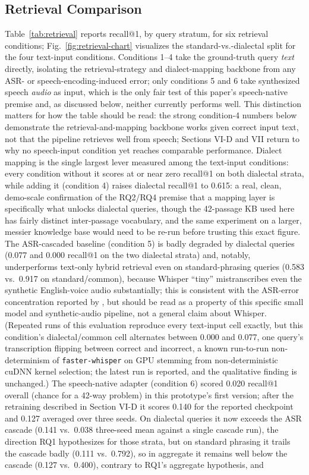 \documentclass[conference]{IEEEtran}
\begin{document}
\subsection{Retrieval Comparison}
Table~\ref{tab:retrieval} reports recall@1, by query stratum, for six retrieval conditions; Fig.~\ref{fig:retrieval-chart} visualizes the standard-vs.-dialectal split for the four text-input conditions. Conditions 1--4 take the ground-truth query \emph{text} directly, isolating the retrieval-strategy and dialect-mapping backbone from any ASR- or speech-encoding-induced error; only conditions 5 and 6 take synthesized speech \emph{audio} as input, which is the only fair test of this paper's speech-native premise and, as discussed below, neither currently performs well. This distinction matters for how the table should be read: the strong condition-4 numbers below demonstrate the retrieval-and-mapping backbone works given correct input text, not that the pipeline retrieves well from speech; Sections VI-D and VII return to why no speech-input condition yet reaches comparable performance. Dialect mapping is the single largest lever measured among the text-input conditions: every condition without it scores at or near zero recall@1 on both dialectal strata, while adding it (condition 4) raises dialectal recall@1 to 0.615: a real, clean, demo-scale confirmation of the RQ2/RQ4 premise that a mapping layer is specifically what unlocks dialectal queries, though the 42-passage KB used here has fairly distinct inter-passage vocabulary, and the same experiment on a larger, messier knowledge base would need to be re-run before trusting this exact figure. The ASR-cascaded baseline (condition 5) is badly degraded by dialectal queries (0.077 and 0.000 recall@1 on the two dialectal strata) and, notably, underperforms text-only hybrid retrieval even on standard-phrasing queries (0.583 vs.\ 0.917 on standard/common), because Whisper ``tiny'' mistranscribes even the synthetic English-voice audio substantially; this is consistent with the ASR-error concentration reported by \cite{benchmarkingasr2026,dialectmatters2026}, but should be read as a property of this specific small model and synthetic-audio pipeline, not a general claim about Whisper. (Repeated runs of this evaluation reproduce every text-input cell exactly, but this condition's dialectal/common cell alternates between 0.000 and 0.077, one query's transcription flipping between correct and incorrect, a known run-to-run non-determinism of \texttt{faster-whisper} on GPU stemming from non-deterministic cuDNN kernel selection; the latest run is reported, and the qualitative finding is unchanged.) The speech-native adapter (condition 6) scored 0.020 recall@1 overall (chance for a 42-way problem) in this prototype's first version; after the retraining described in Section VI-D it scores 0.140 for the reported checkpoint and 0.127 averaged over three seeds. On dialectal queries it now exceeds the ASR cascade (0.141 vs.\ 0.038 three-seed mean against a single cascade run), the direction RQ1 hypothesizes for those strata, but on standard phrasing it trails the cascade badly (0.111 vs.\ 0.792), so in aggregate it remains well below the cascade (0.127 vs.\ 0.400), contrary to RQ1's aggregate hypothesis, and 
\end{document}

